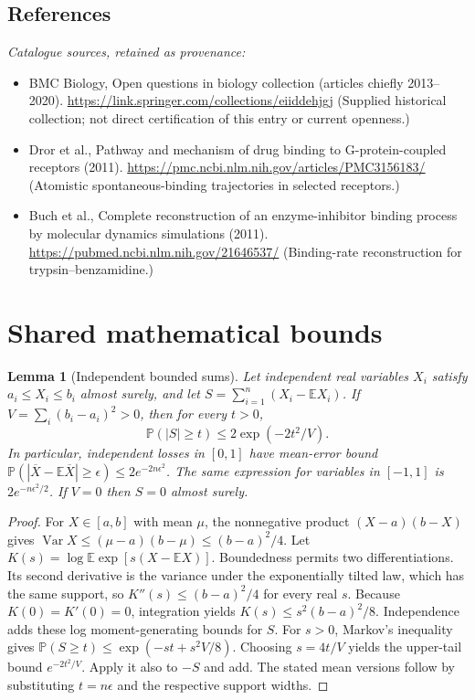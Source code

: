 \documentclass[11pt]{article}
\newcommand{\E}{\mathbb E}
\newcommand{\Prob}{\mathbb P}
\DeclareMathOperator{\Var}{Var}
\providecommand{\E}{\mathbb E}
\providecommand{\Prob}{\mathbb P}
\providecommand{\Var}{\operatorname{Var}}
\newtheorem{sharedlemma}{Lemma}[section]
\begin{document}
\subsection{References}
\noindent\emph{Catalogue sources, retained as provenance:}
\begin{itemize}
\item BMC Biology, Open questions in biology collection (articles chiefly 2013--2020). \url{https://link.springer.com/collections/eiiddehjgj} (Supplied historical collection; not direct certification of this entry or current openness.)
\item Dror et al., Pathway and mechanism of drug binding to G-protein-coupled receptors (2011). \url{https://pmc.ncbi.nlm.nih.gov/articles/PMC3156183/} (Atomistic spontaneous-binding trajectories in selected receptors.)
\item Buch et al., Complete reconstruction of an enzyme-inhibitor binding process by molecular dynamics simulations (2011). \url{https://pubmed.ncbi.nlm.nih.gov/21646537/} (Binding-rate reconstruction for trypsin--benzamidine.)
\end{itemize}
\clearpage


\appendix
\section{Shared mathematical bounds}\label{app:bounds}
\begin{sharedlemma}[Independent bounded sums]\label{lem:bounded}
Let independent real variables $X_i$ satisfy $a_i\leq X_i\leq b_i$ almost surely,
and let $S=\sum_{i=1}^n(X_i-\E X_i)$. If
$V=\sum_i(b_i-a_i)^2>0$, then for every $t>0$,
\[
 \Prob(|S|\geq t)\leq 2\exp(-2t^2/V).
\]
In particular, independent losses in $[0,1]$ have mean-error bound
$\Prob(|\overline X-\E\overline X|\geq\epsilon)
\leq2e^{-2n\epsilon^2}$. The same expression for variables in $[-1,1]$
is $2e^{-n\epsilon^2/2}$. If $V=0$ then $S=0$ almost surely.
\end{sharedlemma}
\begin{proof}
For $X\in[a,b]$ with mean $\mu$, the nonnegative product
$(X-a)(b-X)$ gives
$\Var X\leq(\mu-a)(b-\mu)\leq(b-a)^2/4$.
Let $K(s)=\log\E\exp[s(X-\E X)]$.
Boundedness permits two differentiations. Its second derivative is the variance
under the exponentially tilted law, which has the same support, so
$K''(s)\leq(b-a)^2/4$ for every real $s$.
Because $K(0)=K'(0)=0$, integration yields
$K(s)\leq s^2(b-a)^2/8$.
Independence adds these log moment-generating bounds for $S$.
For $s>0$, Markov's inequality gives
$\Prob(S\geq t)\leq\exp(-st+s^2V/8)$.
Choosing $s=4t/V$ yields the upper-tail bound $e^{-2t^2/V}$.
Apply it also to $-S$ and add. The stated mean versions follow by substituting
$t=n\epsilon$ and the respective support widths.
\end{proof}
\end{document}
